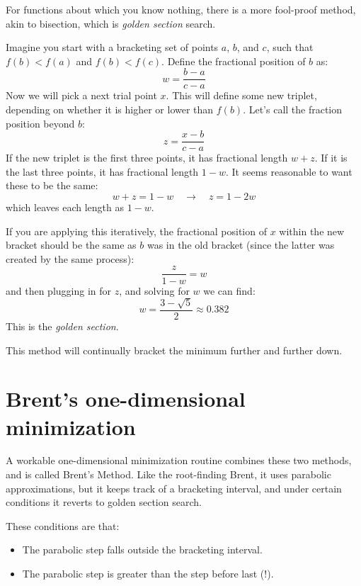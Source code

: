 For functions about which you know nothing, there is a more fool-proof
method, akin to bisection, which is {\it golden section} search.

Imagine you start with a bracketing set of points $a$, $b$, and $c$,
such that $f(b)<f(a)$ and $f(b)<f(c)$. Define the fractional position
of $b$ as:
\begin{equation}
w = \frac{b-a}{c-a}
\end{equation}
Now we will pick a next trial point $x$. This will define some new
triplet, depending on whether it is higher or lower than $f(b)$. Let's
call the fraction position beyond $b$:
\begin{equation}
z = \frac{x-b}{c-a}
\end{equation}
If the new triplet is the first three points, it has fractional length
$w+z$. If it is the last three points, it has fractional length
$1-w$. It seems reasonable to want these to be the same:
\begin{equation}
w+z = 1 - w \quad\rightarrow\quad z = 1 - 2w
\end{equation}
which leaves each length as $1-w$. 

If you are applying this iteratively, the fractional position of $x$
within the new bracket should be the same as $b$ was in the old
bracket (since the latter was created by the same process):
\begin{equation}
\frac{z}{1-w} = w
\end{equation}
and then plugging in for $z$, and solving for $w$ we can find:
\begin{equation}
w = \frac{3-\sqrt{5}}{2} \approx 0.382
\end{equation}
This is the {\it golden section}.

This method will continually bracket the minimum further and further
down. 

\section{Brent's one-dimensional minimization}

A workable one-dimensional minimization routine combines these two
methods, and is called Brent's Method. Like the root-finding Brent, it
uses parabolic approximations, but it keeps track of a bracketing
interval, and under certain conditions it reverts to golden section
search.

These conditions are that:
\begin{itemize}
\item The parabolic step falls outside the  bracketing interval.
\item The parabolic step is greater than the step before last (!).
\end{itemize}

